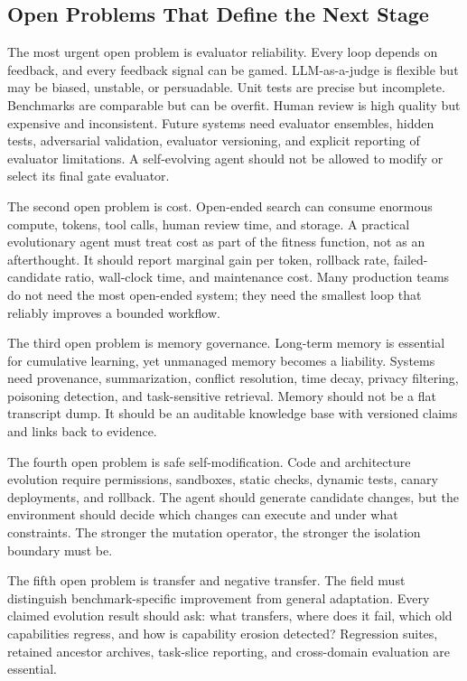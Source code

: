 \subsection{Open Problems That Define the Next Stage}

The most urgent open problem is evaluator reliability. Every loop depends on feedback, and every feedback signal can be gamed. LLM-as-a-judge is flexible but may be biased, unstable, or persuadable. Unit tests are precise but incomplete. Benchmarks are comparable but can be overfit. Human review is high quality but expensive and inconsistent. Future systems need evaluator ensembles, hidden tests, adversarial validation, evaluator versioning, and explicit reporting of evaluator limitations. A self-evolving agent should not be allowed to modify or select its final gate evaluator.

The second open problem is cost. Open-ended search can consume enormous compute, tokens, tool calls, human review time, and storage. A practical evolutionary agent must treat cost as part of the fitness function, not as an afterthought. It should report marginal gain per token, rollback rate, failed-candidate ratio, wall-clock time, and maintenance cost. Many production teams do not need the most open-ended system; they need the smallest loop that reliably improves a bounded workflow.

The third open problem is memory governance. Long-term memory is essential for cumulative learning, yet unmanaged memory becomes a liability. Systems need provenance, summarization, conflict resolution, time decay, privacy filtering, poisoning detection, and task-sensitive retrieval. Memory should not be a flat transcript dump. It should be an auditable knowledge base with versioned claims and links back to evidence.

The fourth open problem is safe self-modification. Code and architecture evolution require permissions, sandboxes, static checks, dynamic tests, canary deployments, and rollback. The agent should generate candidate changes, but the environment should decide which changes can execute and under what constraints. The stronger the mutation operator, the stronger the isolation boundary must be.

The fifth open problem is transfer and negative transfer. The field must distinguish benchmark-specific improvement from general adaptation. Every claimed evolution result should ask: what transfers, where does it fail, which old capabilities regress, and how is capability erosion detected? Regression suites, retained ancestor archives, task-slice reporting, and cross-domain evaluation are essential.

